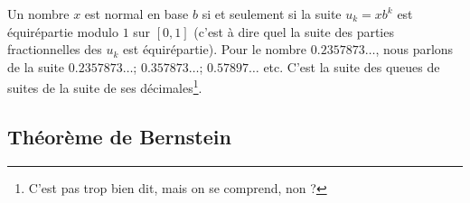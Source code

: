 \begin{remark}  \label{RemUXAkcuH}
Un nombre \( x\) est normal en base \( b\) si et seulement si la suite  \( u_k=xb^k\) est équirépartie modulo \( 1\) sur \( [0,1]\) (c'est à dire quel la suite des parties fractionnelles des \( u_k\) est équirépartie). Pour le nombre \( 0.2357873\ldots\), nous parlons de la suite \( 0.2357873\ldots\); \( 0.357873\ldots\); \( 0.57897\ldots\) etc. C'est la suite des queues de suites de la suite de ses décimales\footnote{C'est pas trop bien dit, mais on se comprend, non ?}.
\end{remark}

\subsection{Théorème de Bernstein}

